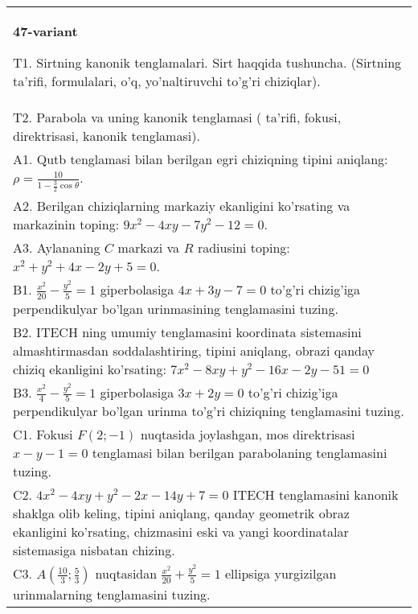 \documentclass{article}
\begin{document}
\begin{tabular}{m{17cm}}
\textbf{47-variant}
\newline

T1. Sirtning kanonik tenglamalari. Sirt haqqida tushuncha. (Sirtning ta'rifi, formulalari, o'q, yo'naltiruvchi to'g'ri chiziqlar).\\

T2. Parabola va uning kanonik tenglamasi ( ta'rifi, fokusi, direktrisasi, kanonik tenglamasi).\\

A1. Qutb tenglamasi bilan berilgan egri chiziqning tipini aniqlang: $\rho=\frac{10}{1-\frac{3}{2}\cos\theta}$.\\

A2. Berilgan chiziqlarning markaziy ekanligini ko'rsating va markazinin toping: $9x^{2}-4xy-7y^{2}-12=0$.\\

A3. Aylananing $C$ markazi va $R$ radiusini toping: $x^2+y^2+4x-2y+5=0$.\\

B1. $\frac{x^{2}}{20} - \frac{y^{2}}{5} = 1$ giperbolasiga $4x + 3y - 7 = 0$ to'g'ri chizig'iga perpendikulyar bo'lgan urinmasining tenglamasini tuzing.  \\

B2. ITECH ning umumiy tenglamasini koordinata sistemasini almashtirmasdan soddalashtiring, tipini aniqlang, obrazi qanday chiziq ekanligini ko'rsating: $7x^{2} - 8xy + y^{2} - 16x - 2y - 51 = 0$\\

B3. $\frac{x^{2}}{4} - \frac{y^{2}}{5} = 1$ giperbolasiga $3x + 2y = 0$ to'g'ri chizig'iga perpendikulyar bo'lgan urinma to'g'ri chiziqning tenglamasini tuzing.\\

C1. Fokusi $F(2; - 1)$ nuqtasida joylashgan, mos direktrisasi $x - y - 1 = 0$ tenglamasi bilan berilgan parabolaning tenglamasini tuzing.  \\

C2. $4x^{2} - 4xy + y^{2} - 2x - 14y + 7 = 0$ ITECH tenglamasini kanonik shaklga olib keling, tipini aniqlang, qanday geometrik obraz ekanligini ko'rsating, chizmasini eski va yangi koordinatalar sistemasiga nisbatan chizing.  \\

C3. $A(\frac{10}{3};\frac{5}{3})$ nuqtasidan $\frac{x^{2}}{20} + \frac{y^{2}}{5} = 1$ ellipsiga yurgizilgan urinmalarning tenglamasini tuzing.  \\

\end{tabular}
\vspace{1cm}
\end{document}
